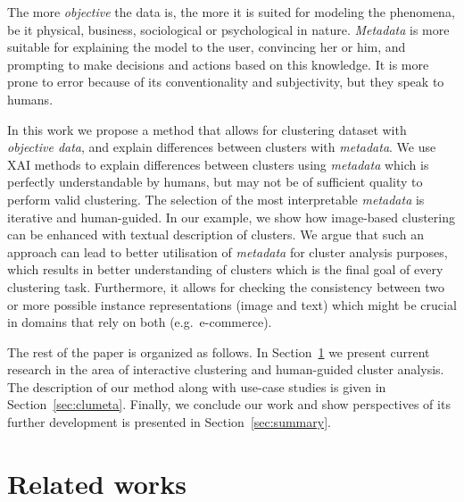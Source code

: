 \documentclass[
 twocolumn,
 hf,
]{ceurart}
\begin{document}
The more \textit{objective} the data is, the more it is suited for modeling the phenomena, be it physical, business, sociological or psychological in nature.
\textit{Metadata} is more suitable for explaining the model to the user, convincing her or him, and prompting to make decisions and actions based on this knowledge.
It is more prone to error because of its conventionality and subjectivity, but they speak to humans.

In this work we propose a method that allows for clustering dataset with \textit{objective data}, and explain differences between clusters with \textit{metadata}.
We use XAI methods to explain differences between clusters using \textit{metadata} which is perfectly understandable by humans, but may not be of sufficient quality to perform valid clustering.
The selection of the most interpretable \textit{metadata} is iterative and human-guided.
In our example, we show how image-based clustering can be enhanced with textual description of clusters.
We argue that such an approach can lead to better utilisation of \textit{metadata} for cluster analysis purposes, which results in better understanding of clusters which is the final goal of every clustering task. %
Furthermore, it allows for checking the consistency between two or more possible instance representations (image and text) which might be crucial in domains that rely on both (e.g.\ e-commerce).

The rest of the paper is organized as follows.
In Section~\ref{sec:sota} we present current research in the area of interactive clustering and human-guided cluster analysis.
The description of our method along with use-case studies is given in Section~\ref{sec:clumeta}.
Finally, we conclude our work and show perspectives of its further development is presented in Section~\ref{sec:summary}.

\section{Related works}
\label{sec:sota}
\end{document}
